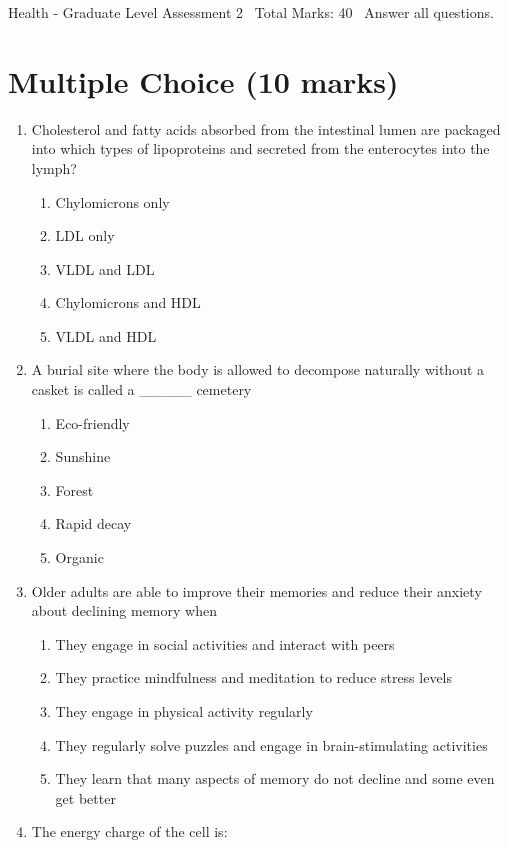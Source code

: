 \documentclass[12pt]{article}
\begin{document}
\begin{center}
Health - Graduate Level Assessment 2 \
Total Marks: 40 \
Answer all questions.
\end{center}

\section*{Multiple Choice (10 marks)}
\begin{enumerate}[label=\arabic*.]
\item Cholesterol and fatty acids absorbed from the intestinal lumen are packaged into which
types of lipoproteins and secreted from the enterocytes into the lymph?
\begin{enumerate}[label=(\alph*)]
    \item Chylomicrons only
    \item LDL only
    \item VLDL and LDL
    \item Chylomicrons and HDL
    \item VLDL and HDL
\end{enumerate}
\item A burial site where the body is allowed to decompose naturally without a casket is called
a \_\_\_\_\_ cemetery
\begin{enumerate}[label=(\alph*)]
    \item Eco-friendly
    \item Sunshine
    \item Forest
    \item Rapid decay
    \item Organic
\end{enumerate}
\item Older adults are able to improve their memories and reduce their anxiety about declining
memory when
\begin{enumerate}[label=(\alph*)]
    \item They engage in social activities and interact with peers
    \item They practice mindfulness and meditation to reduce stress levels
    \item They engage in physical activity regularly
    \item They regularly solve puzzles and engage in brain-stimulating activities
    \item They learn that many aspects of memory do not decline and some even get better
\end{enumerate}
\item The energy charge of the cell is:

\end{enumerate}
\end{document}
